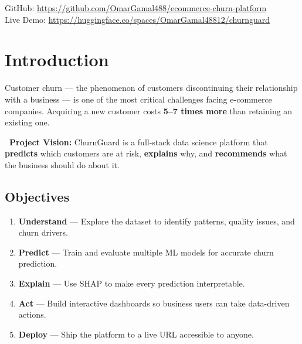 \documentclass[11pt,a4paper]{article}
\newcommand{\highlight}[1]{\textbf{\color{primary}#1}}
\begin{document}
\begin{titlepage}
\vfill
\begin{center}
    \color{white}\small
    GitHub: \url{https://github.com/OmarGamal488/ecommerce-churn-platform}\\
    Live Demo: \url{https://huggingface.co/spaces/OmarGamal48812/churnguard}
\end{center}
\end{titlepage}

\tableofcontents
\newpage

\section{Introduction}

Customer churn --- the phenomenon of customers discontinuing their relationship with a business --- is one of the most critical challenges facing e-commerce companies. Acquiring a new customer costs \highlight{5--7 times more} than retaining an existing one.

\begin{infobox}
\textbf{\faLightbulb\ Project Vision:} ChurnGuard is a full-stack data science platform that \textbf{predicts} which customers are at risk, \textbf{explains} why, and \textbf{recommends} what the business should do about it.
\end{infobox}

\subsection{Objectives}

\begin{enumerate}[leftmargin=*, label=\textcolor{primary}{\arabic*.}]
    \item \textbf{Understand} --- Explore the dataset to identify patterns, quality issues, and churn drivers.
    \item \textbf{Predict} --- Train and evaluate multiple ML models for accurate churn prediction.
    \item \textbf{Explain} --- Use SHAP to make every prediction interpretable.
    \item \textbf{Act} --- Build interactive dashboards so business users can take data-driven actions.
    \item \textbf{Deploy} --- Ship the platform to a live URL accessible to anyone.
\end{enumerate}
\end{document}
